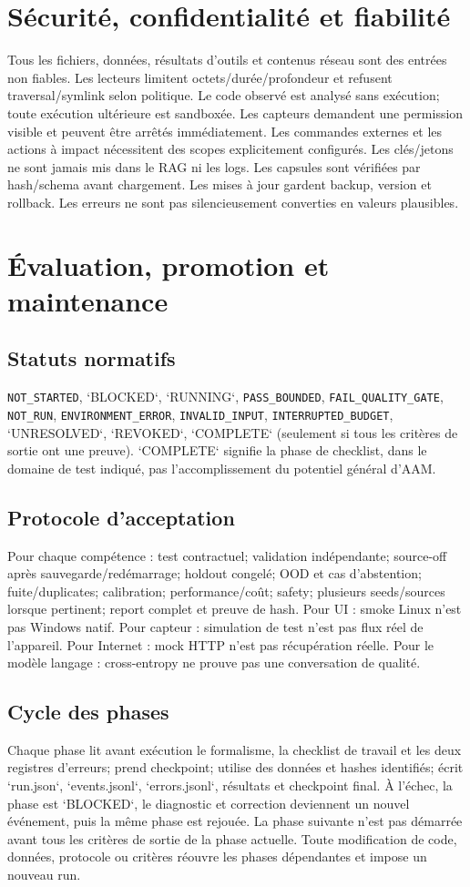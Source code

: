\documentclass[11pt,a4paper,oneside]{report}
\begin{document}
\chapter{Sécurité, confidentialité et fiabilité}
Tous les fichiers, données, résultats d'outils et contenus réseau sont des entrées non fiables. Les lecteurs limitent octets/durée/profondeur et refusent traversal/symlink selon politique. Le code observé est analysé sans exécution; toute exécution ultérieure est sandboxée. Les capteurs demandent une permission visible et peuvent être arrêtés immédiatement. Les commandes externes et les actions à impact nécessitent des scopes explicitement configurés. Les clés/jetons ne sont jamais mis dans le RAG ni les logs. Les capsules sont vérifiées par hash/schema avant chargement. Les mises à jour gardent backup, version et rollback. Les erreurs ne sont pas silencieusement converties en valeurs plausibles.

\chapter{Évaluation, promotion et maintenance}
\section{Statuts normatifs}
\texttt{NOT\_STARTED}, `BLOCKED`, `RUNNING`, \texttt{PASS\_BOUNDED}, \texttt{FAIL\_QUALITY\_GATE}, \texttt{NOT\_RUN}, \texttt{ENVIRONMENT\_ERROR}, \texttt{INVALID\_INPUT}, \texttt{INTERRUPTED\_BUDGET}, `UNRESOLVED`, `REVOKED`, `COMPLETE` (seulement si tous les critères de sortie ont une preuve). `COMPLETE` signifie la phase de checklist, dans le domaine de test indiqué, pas l'accomplissement du potentiel général d'AAM.

\section{Protocole d'acceptation}
Pour chaque compétence : test contractuel; validation indépendante; source-off après sauvegarde/redémarrage; holdout congelé; OOD et cas d'abstention; fuite/duplicates; calibration; performance/coût; safety; plusieurs seeds/sources lorsque pertinent; report complet et preuve de hash. Pour UI : smoke Linux n'est pas Windows natif. Pour capteur : simulation de test n'est pas flux réel de l'appareil. Pour Internet : mock HTTP n'est pas récupération réelle. Pour le modèle langage : cross-entropy ne prouve pas une conversation de qualité.

\section{Cycle des phases}
Chaque phase lit avant exécution le formalisme, la checklist de travail et les deux registres d'erreurs; prend checkpoint; utilise des données et hashes identifiés; écrit `run.json`, `events.jsonl`, `errors.jsonl`, résultats et checkpoint final. À l'échec, la phase est `BLOCKED`, le diagnostic et correction deviennent un nouvel événement, puis la même phase est rejouée. La phase suivante n'est pas démarrée avant tous les critères de sortie de la phase actuelle. Toute modification de code, données, protocole ou critères réouvre les phases dépendantes et impose un nouveau run.
\end{document}
